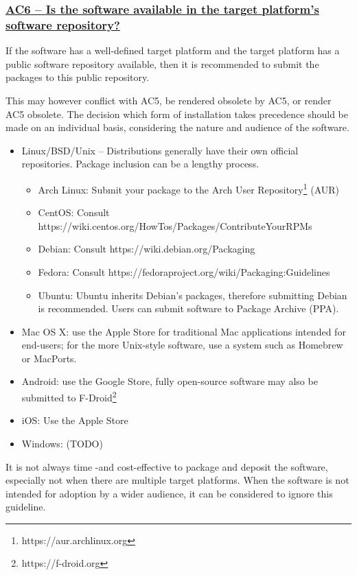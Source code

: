 \documentclass[a4paper,11pt]{article}
\newcommand{\criterion}[1]{\subsubsection*{\underline{#1}}}
\begin{document}
\newcommand{\acSixID}{AC6}
\newcommand{\acSixText}{Is the software available in the target platform's software repository?}
\criterion{\acSixID{ }--{ }\acSixText}\label{id:ac6} 

If the software has a well-defined target platform and the target platform has
a public software repository available, then it is recommended to submit the
packages to this public repository.

This may however conflict with AC5, be rendered obsolete by AC5, or render AC5
obsolete. The decision which form of installation takes precedence should be
made on an individual basis, considering the nature and audience of the
software.

\begin{itemize}
    \item Linux/BSD/Unix -- Distributions generally have their own official repositories. Package inclusion can be a lengthy process.
    \begin{itemize}
        \item Arch Linux: Submit your package to the Arch User Repository\footnote{https://aur.archlinux.org} (AUR)
		\item CentOS: Consult https://wiki.centos.org/HowTos/Packages/ContributeYourRPMs
        \item Debian: Consult https://wiki.debian.org/Packaging
        \item Fedora: Consult https://fedoraproject.org/wiki/Packaging:Guidelines
        \item Ubuntu: Ubuntu inherits Debian's packages, therefore submitting Debian is recommended. Users can submit software  to Package Archive (PPA).
    \end{itemize}
    \item Mac OS X: use the Apple Store for traditional Mac applications intended for end-users; for the more Unix-style
        software, use a system such as Homebrew or MacPorts.
    \item Android: use the Google Store, fully open-source software may also be submitted to F-Droid\footnote{https://f-droid.org}
    \item iOS: Use the Apple Store
    \item Windows: (TODO) 
\end{itemize}

It is not always time -and cost-effective to package and deposit the software,
especially not when there are multiple target platforms. When the software is
not intended for adoption by a wider audience, it can be considered to ignore
this guideline.
\end{document}
